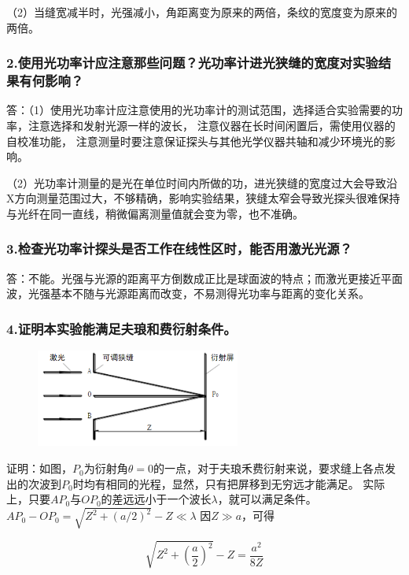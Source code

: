 \documentclass[12pt,a4paper,UTF8]{ctexart}
\begin{document}
（2）当缝宽减半时，光强减小，角距离变为原来的两倍，条纹的宽度变为原来的两倍。

\subsubsection*{2.使用光功率计应注意那些问题？光功率计进光狭缝的宽度对实验结果有何影响？}
答：（1）使用光功率计应注意使用的光功率计的测试范围，选择适合实验需要的功率，注意选择和发射光源一样的波长，
	注意仪器在长时间闲置后，需使用仪器的自校准功能，
	注意测量时要注意保证探头与其他光学仪器共轴和减少环境光的影响。

（2）光功率计测量的是光在单位时间内所做的功，进光狭缝的宽度过大会导致沿X方向测量范围过大，不够精确，影响实验结果，狭缝太窄会导致光探头很难保持与光纤在同一直线，稍微偏离测量值就会变为零，也不准确。

\subsubsection*{3.检查光功率计探头是否工作在线性区时，能否用激光光源？}
答：不能。光强与光源的距离平方倒数成正比是球面波的特点；而激光更接近平面波，光强基本不随与光源距离而改变，不易测得光功率与距离的变化关系。

\subsubsection*{4.证明本实验能满足夫琅和费衍射条件。}

\begin{figure}[htbp]
	\centering
	\includegraphics[width=0.6\textwidth]{img//1.png}
	\label{fig:7}
\end{figure}

证明：如图，$P_0$为衍射角$\theta=0$的一点，对于夫琅禾费衍射来说，要求缝上各点发出的次波到$P_0$时均有相同的光程，显然，只有把屏移到无穷远才能满足。
实际上，只要$AP_0$与$OP_0$的差远远小于一个波长$\lambda$，就可以满足条件。
$AP_0-OP_0=\sqrt{Z^2+(a/2)^2}-Z \ll \lambda$
因$Z\gg a$，可得

\begin{equation*}
	\sqrt{Z^2+(\frac{a}{2})^2}-Z = \frac{a^2}{8Z}
\end{equation*}
\end{document}
